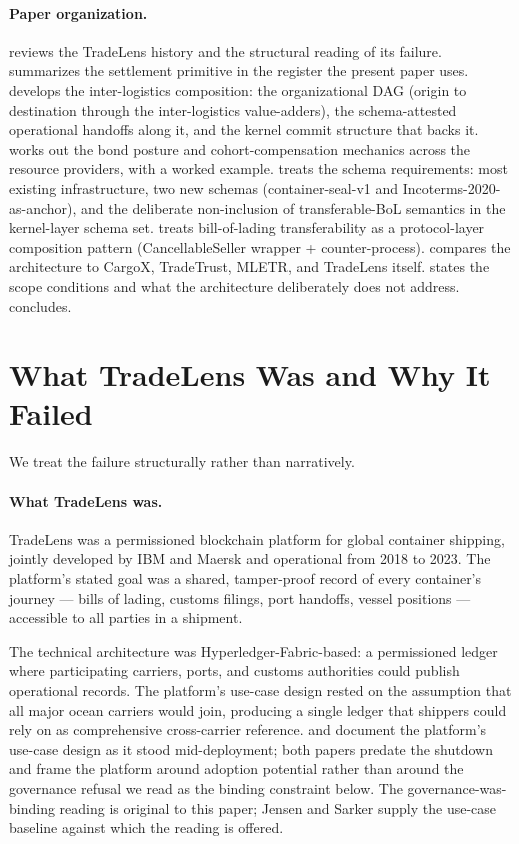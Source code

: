 \documentclass[11pt,a4paper]{article}
\theoremstyle{definition}
\theoremstyle{remark}
\begin{document}
\paragraph{Paper organization.}
 reviews the TradeLens history and the
structural reading of its failure.
 summarizes the settlement primitive in the
register the present paper uses.
 develops the inter-logistics composition: the
organizational DAG (origin to destination through the
inter-logistics value-adders), the schema-attested operational
handoffs along it, and the kernel commit structure that backs it.
 works out the bond posture and cohort-compensation
mechanics across the resource providers, with a worked example.
 treats the schema requirements: most existing
infrastructure, two new schemas (container-seal-v1 and
Incoterms-2020-as-anchor), and the deliberate non-inclusion of
transferable-BoL semantics in the kernel-layer schema set.
 treats bill-of-lading transferability as a
protocol-layer composition pattern (CancellableSeller wrapper +
counter-process).
 compares the architecture to CargoX,
TradeTrust, MLETR, and TradeLens itself.
 states the scope conditions and what the
architecture deliberately does not address.
 concludes.

\section{What TradeLens Was and Why It Failed}
\label{sec:tradelens}

We treat the failure structurally rather than narratively.

\paragraph{What TradeLens was.}
TradeLens was a permissioned blockchain platform for global
container shipping, jointly developed by IBM and Maersk and
operational from 2018 to 2023. The platform's stated goal was a
shared, tamper-proof record of every container's journey ---
bills of lading, customs filings, port handoffs, vessel positions
--- accessible to all parties in a shipment.

The technical architecture was Hyperledger-Fabric-based: a
permissioned ledger where participating carriers, ports, and
customs authorities could publish operational records. The
platform's use-case design rested on the assumption that all
major ocean carriers would join, producing a single ledger that
shippers could rely on as comprehensive cross-carrier reference.
\citet{jensen_etal_2019} and \citet{sarker_etal_2021} document
the platform's use-case design as it stood mid-deployment; both
papers predate the shutdown and frame the platform around
adoption potential rather than around the governance refusal we
read as the binding constraint below. The governance-was-binding
reading is original to this paper; Jensen and Sarker supply the
use-case baseline against which the reading is offered.
\end{document}
